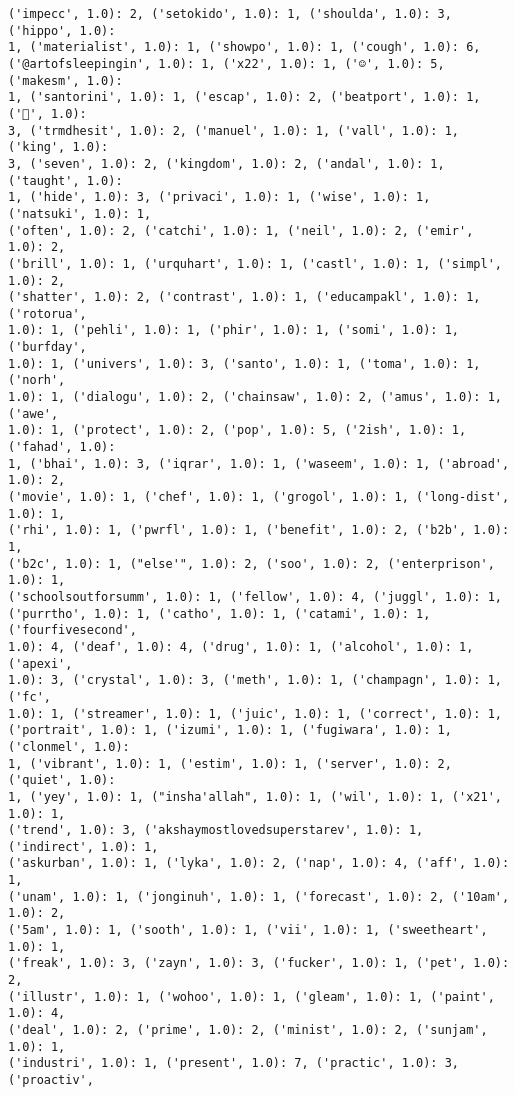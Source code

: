 \documentclass[11pt]{article}
\begin{document}
\begin{Verbatim}[commandchars=\\\{\}]
('impecc', 1.0): 2, ('setokido', 1.0): 1, ('shoulda', 1.0): 3, ('hippo', 1.0):
1, ('materialist', 1.0): 1, ('showpo', 1.0): 1, ('cough', 1.0): 6,
('@artofsleepingin', 1.0): 1, ('x22', 1.0): 1, ('☺', 1.0): 5, ('makesm', 1.0):
1, ('santorini', 1.0): 1, ('escap', 1.0): 2, ('beatport', 1.0): 1, ('🏻', 1.0):
3, ('trmdhesit', 1.0): 2, ('manuel', 1.0): 1, ('vall', 1.0): 1, ('king', 1.0):
3, ('seven', 1.0): 2, ('kingdom', 1.0): 2, ('andal', 1.0): 1, ('taught', 1.0):
1, ('hide', 1.0): 3, ('privaci', 1.0): 1, ('wise', 1.0): 1, ('natsuki', 1.0): 1,
('often', 1.0): 2, ('catchi', 1.0): 1, ('neil', 1.0): 2, ('emir', 1.0): 2,
('brill', 1.0): 1, ('urquhart', 1.0): 1, ('castl', 1.0): 1, ('simpl', 1.0): 2,
('shatter', 1.0): 2, ('contrast', 1.0): 1, ('educampakl', 1.0): 1, ('rotorua',
1.0): 1, ('pehli', 1.0): 1, ('phir', 1.0): 1, ('somi', 1.0): 1, ('burfday',
1.0): 1, ('univers', 1.0): 3, ('santo', 1.0): 1, ('toma', 1.0): 1, ('norh',
1.0): 1, ('dialogu', 1.0): 2, ('chainsaw', 1.0): 2, ('amus', 1.0): 1, ('awe',
1.0): 1, ('protect', 1.0): 2, ('pop', 1.0): 5, ('2ish', 1.0): 1, ('fahad', 1.0):
1, ('bhai', 1.0): 3, ('iqrar', 1.0): 1, ('waseem', 1.0): 1, ('abroad', 1.0): 2,
('movie', 1.0): 1, ('chef', 1.0): 1, ('grogol', 1.0): 1, ('long-dist', 1.0): 1,
('rhi', 1.0): 1, ('pwrfl', 1.0): 1, ('benefit', 1.0): 2, ('b2b', 1.0): 1,
('b2c', 1.0): 1, ("else'", 1.0): 2, ('soo', 1.0): 2, ('enterprison', 1.0): 1,
('schoolsoutforsumm', 1.0): 1, ('fellow', 1.0): 4, ('juggl', 1.0): 1,
('purrtho', 1.0): 1, ('catho', 1.0): 1, ('catami', 1.0): 1, ('fourfivesecond',
1.0): 4, ('deaf', 1.0): 4, ('drug', 1.0): 1, ('alcohol', 1.0): 1, ('apexi',
1.0): 3, ('crystal', 1.0): 3, ('meth', 1.0): 1, ('champagn', 1.0): 1, ('fc',
1.0): 1, ('streamer', 1.0): 1, ('juic', 1.0): 1, ('correct', 1.0): 1,
('portrait', 1.0): 1, ('izumi', 1.0): 1, ('fugiwara', 1.0): 1, ('clonmel', 1.0):
1, ('vibrant', 1.0): 1, ('estim', 1.0): 1, ('server', 1.0): 2, ('quiet', 1.0):
1, ('yey', 1.0): 1, ("insha'allah", 1.0): 1, ('wil', 1.0): 1, ('x21', 1.0): 1,
('trend', 1.0): 3, ('akshaymostlovedsuperstarev', 1.0): 1, ('indirect', 1.0): 1,
('askurban', 1.0): 1, ('lyka', 1.0): 2, ('nap', 1.0): 4, ('aff', 1.0): 1,
('unam', 1.0): 1, ('jonginuh', 1.0): 1, ('forecast', 1.0): 2, ('10am', 1.0): 2,
('5am', 1.0): 1, ('sooth', 1.0): 1, ('vii', 1.0): 1, ('sweetheart', 1.0): 1,
('freak', 1.0): 3, ('zayn', 1.0): 3, ('fucker', 1.0): 1, ('pet', 1.0): 2,
('illustr', 1.0): 1, ('wohoo', 1.0): 1, ('gleam', 1.0): 1, ('paint', 1.0): 4,
('deal', 1.0): 2, ('prime', 1.0): 2, ('minist', 1.0): 2, ('sunjam', 1.0): 1,
('industri', 1.0): 1, ('present', 1.0): 7, ('practic', 1.0): 3, ('proactiv',

\end{Verbatim}
\end{document}
